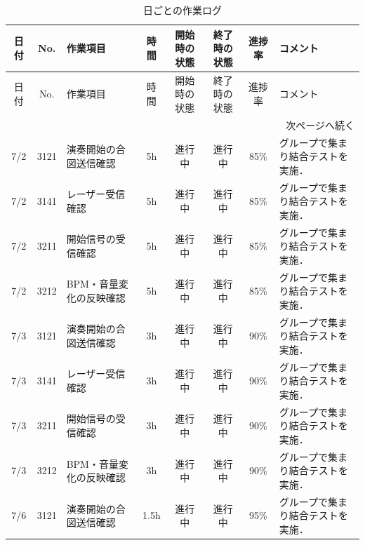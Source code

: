 \documentclass[uplatex,dvipdfmx,a4paper,11pt]{jsarticle}
\begin{document}
    \begin{longtable}{|c|c|p{2.4cm}|c|c|c|c|p{3.8cm}|}
    \caption{日ごとの作業ログ} \\
    \hline
    日付 & No. & 作業項目 & 時間 & 開始時の状態 & 終了時の状態 & 進捗率 & コメント \\
    \hline
    \endfirsthead

    \hline
    日付 & No. & 作業項目 & 時間 & 開始時の状態 & 終了時の状態 & 進捗率 & コメント \\
    \hline
    \endhead

    \hline
    \multicolumn{8}{r}{次ページへ続く} \\
    \hline
    \endfoot

    \hline
    \endlastfoot

    7/2 & 3121 & 演奏開始の合図送信確認 & 5h &
    進行中 &
    進行中 &
    85\% &
    グループで集まり結合テストを実施．\\
    \hline

    7/2 & 3141 & レーザー受信確認 & 5h &
    進行中 &
    進行中 &
    85\% &
    グループで集まり結合テストを実施．\\
    \hline

    7/2 & 3211 & 開始信号の受信確認 & 5h &
    進行中 &
    進行中 &
    85\% &
    グループで集まり結合テストを実施．\\
    \hline

    7/2 & 3212 & BPM・音量変化の反映確認 & 5h &
    進行中 &
    進行中 &
    85\% &
    グループで集まり結合テストを実施．\\
    \hline

    7/3 & 3121 & 演奏開始の合図送信確認 & 3h &
    進行中 &
    進行中 &
    90\% &
    グループで集まり結合テストを実施．\\
    \hline

    7/3 & 3141 & レーザー受信確認 & 3h &
    進行中 &
    進行中 &
    90\% &
    グループで集まり結合テストを実施．\\
    \hline

    7/3 & 3211 & 開始信号の受信確認 & 3h &
    進行中 &
    進行中 &
    90\% &
    グループで集まり結合テストを実施．\\
    \hline

    7/3 & 3212 & BPM・音量変化の反映確認 & 3h &
    進行中 &
    進行中 &
    90\% &
    グループで集まり結合テストを実施．\\
    \hline

    7/6 & 3121 & 演奏開始の合図送信確認 & 1.5h &
    進行中 &
    進行中 &
    95\% &
    グループで集まり結合テストを実施．\\
    \hline


\end{longtable}
\end{document}

